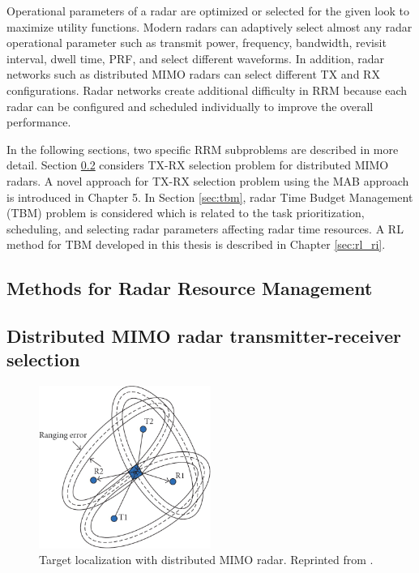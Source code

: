 \documentclass[english, 12pt, a4paper, elec, utf8, a-1b, online]{aaltothesis}
\begin{document}
Operational parameters of a radar are optimized or selected for the given look to maximize utility functions. 
Modern radars can adaptively select almost any radar operational parameter such as transmit power, frequency, bandwidth, revisit interval, dwell time, PRF, and select different waveforms. 
In addition, radar networks such as distributed MIMO radars can select different TX and RX configurations. 
Radar networks create additional difficulty in RRM because each radar can be configured and scheduled individually to improve the overall performance.

In the following sections, two specific RRM subproblems are described in more detail. 
Section \ref{sec:TX_RX_selection_review} considers TX-RX selection problem for distributed MIMO radars. 
A novel approach for TX-RX selection problem using the MAB approach is introduced in Chapter 5.
In Section \ref{sec:tbm}, radar Time Budget Management (TBM) problem is considered which is related to the task prioritization, scheduling, and selecting radar parameters affecting radar time resources. 
A RL method for TBM developed in this thesis is described in Chapter \ref{sec:rl_ri}.

\subsection{Methods for Radar Resource Management}




\subsection{Distributed MIMO radar transmitter-receiver selection}\label{sec:TX_RX_selection_review}

\begin{figure}[b]
    \centering
    \includegraphics[width=0.5\textwidth]{figures/background/MIMO_TX_RX_selection.png}
    \caption{Target localization with distributed MIMO radar. Reprinted from \cite{Sun2014}.}
    \label{fig:dist_MIMO_localization}
\end{figure}
\end{document}
